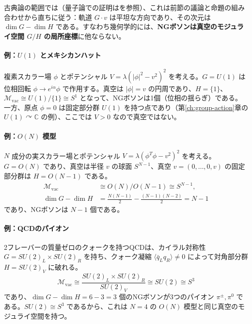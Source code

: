 \documentclass[uplatex, dvipdfmx, book]{jsbook}
\begin{document}
古典論の範囲では（量子論での証明は\cite{peskinintroductionquantumfield2019}を参照）、これは前節の議論と命題の組み合わせから直ちに従う：軌道 $G \cdot v$ は平坦な方向であり、その次元は $\dim G - \dim H$ である。すなわち幾何学的には、\textbf{NGボソンは真空のモジュライ空間 $G/H$ の局所座標}に他ならない。

\paragraph{例：$U(1)$ とメキシカンハット}
複素スカラー場 $\phi$ とポテンシャル $V = \lambda(|\phi|^2 - v^2)^2$ を考える。$G = U(1)$ は位相回転 $\phi \to e^{i\alpha}\phi$ で作用する。真空は $|\phi| = v$ の円周であり、$H = \{1\}$、$\mathcal{M}_{\text{vac}} \cong U(1)/\{1\} \cong S^1$ となって、NGボソンは1個（位相の揺らぎ）である。一方、原点 $\phi = 0$ は固定部分群 $U(1)$ を持つ点であり（第\ref{ch:group-action}章の $U(1) \curvearrowright \mathbb{C}$ の例）、ここでは $V > 0$ なので真空ではない。

\paragraph{例：$O(N)$ 模型}
$N$ 成分の実スカラー場とポテンシャル $V = \lambda(\phi^T\phi - v^2)^2$ を考える。$G = O(N)$ であり、真空は半径 $v$ の球面 $S^{N-1}$、真空 $v = (0, \dots, 0, v)$ の固定部分群は $H = O(N-1)$ である。
\begin{align}
    \mathcal{M}_{\text{vac}} &\cong O(N)/O(N-1) \cong S^{N-1}, \\
    \dim G - \dim H &= \frac{N(N-1)}{2} - \frac{(N-1)(N-2)}{2} = N - 1
\end{align}
であり、NGボソンは $N - 1$ 個である。

\paragraph{例：QCDのパイオン}
2フレーバーの質量ゼロのクォークを持つQCDは、カイラル対称性 $G = SU(2)_L \times SU(2)_R$ を持ち、クォーク凝縮 $\langle \bar{q}_L q_R \rangle \neq 0$ によって対角部分群 $H = SU(2)_V$ に破れる。
\begin{equation}
    \mathcal{M}_{\text{vac}} \cong \frac{SU(2)_L \times SU(2)_R}{SU(2)_V} \cong SU(2) \cong S^3
\end{equation}
であり、$\dim G - \dim H = 6 - 3 = 3$ 個のNGボソンが3つのパイオン $\pi^\pm, \pi^0$ である。$SU(2) \cong S^3$ であるから、これは $N = 4$ の $O(N)$ 模型と同じ真空のモジュライ空間を持つ。
\end{document}
